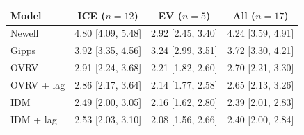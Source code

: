 \begin{tabular}{lccc}
\toprule
Model & ICE ($n = 12$) & EV ($n = 5$) & All ($n = 17$) \\
\midrule
Newell & 4.80 [4.09, 5.48] & 2.92 [2.45, 3.40] & 4.24 [3.59, 4.91] \\
Gipps & 3.92 [3.35, 4.56] & 3.24 [2.99, 3.51] & 3.72 [3.30, 4.21] \\
OVRV & 2.91 [2.24, 3.68] & 2.21 [1.82, 2.60] & 2.70 [2.21, 3.30] \\
OVRV + lag & 2.86 [2.17, 3.64] & 2.14 [1.77, 2.58] & 2.65 [2.13, 3.26] \\
IDM & 2.49 [2.00, 3.05] & 2.16 [1.62, 2.80] & 2.39 [2.01, 2.83] \\
IDM + lag & 2.53 [2.03, 3.10] & 2.08 [1.56, 2.66] & 2.40 [2.00, 2.84] \\
\bottomrule
\end{tabular}
